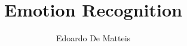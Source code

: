 \documentclass{article}
\title{Emotion Recognition}
\author{Edoardo De Matteis}
\begin{document}
    \maketitle

    \tableofcontents
    \clearpage

    
    
    
    
    

    {}
    
\end{document}
